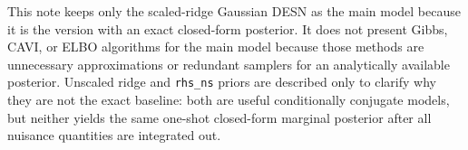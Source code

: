 \documentclass[11pt]{article}
\begin{document}
This note keeps only the scaled-ridge Gaussian DESN as the main model because
it is the version with an exact closed-form posterior. It does not present
Gibbs, CAVI, or ELBO algorithms for the main model because those methods are
unnecessary approximations or redundant samplers for an analytically available
posterior. Unscaled ridge and \texttt{rhs\_ns} priors are described only to
clarify why they are not the exact baseline: both are useful conditionally
conjugate models, but neither yields the same one-shot closed-form marginal
posterior after all nuisance quantities are integrated out.
\end{document}
